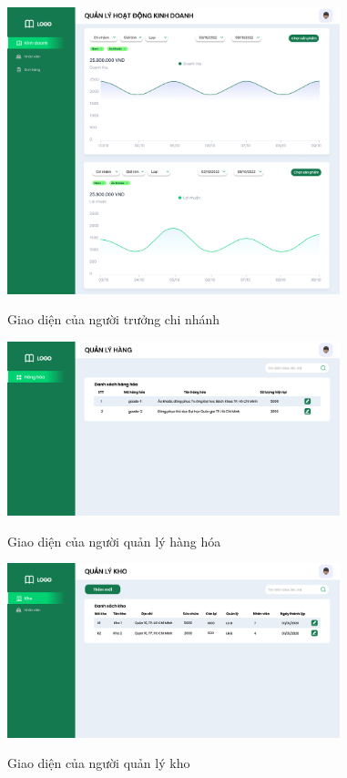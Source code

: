             \begin{figure}[!htp]
                \centering
                \includegraphics[width=3.8in]{img/UI/admin/branch-leader.png}
                \label{45}
                \newline
                \caption{Giao diện của người trưởng chi nhánh}
            \end{figure}
        
            \begin{figure}[!htp]
                \centering
                \includegraphics[width=3.8in]{img/UI/admin/sub ADmin -Quản lý hàng.png}
                \label{46}
                \newline
                \caption{Giao diện của người quản lý hàng hóa}
            \end{figure}
        
            \begin{figure}[!htp]
                \centering
                \includegraphics[width=3.8in]{img/UI/admin/sub-admin -Quản lý kho.png}
                \label{47}
                \newline
                \caption{Giao diện của người quản lý kho }
            \end{figure}
    
    